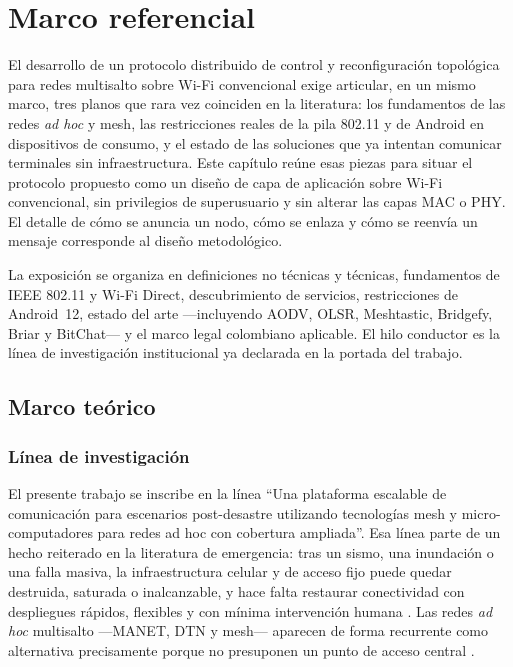 \documentclass[12pt,oneside]{scrreprt}
\begin{document}
\chapter{Marco referencial}
\label{ch:marco}
\label{cap:marco-teorico}

El desarrollo de un protocolo distribuido de control y reconfiguración topológica para redes multisalto sobre Wi-Fi convencional exige articular, en un mismo marco, tres planos que rara vez coinciden en la literatura: los fundamentos de las redes \emph{ad hoc} y mesh, las restricciones reales de la pila 802.11 y de Android en dispositivos de consumo, y el estado de las soluciones que ya intentan comunicar terminales sin infraestructura. Este capítulo reúne esas piezas para situar el protocolo propuesto como un diseño de capa de aplicación sobre Wi-Fi convencional, sin privilegios de superusuario y sin alterar las capas MAC o PHY. El detalle de cómo se anuncia un nodo, cómo se enlaza y cómo se reenvía un mensaje corresponde al diseño metodológico.

La exposición se organiza en definiciones no técnicas y técnicas, fundamentos de IEEE 802.11 y Wi-Fi Direct, descubrimiento de servicios, restricciones de Android~12, estado del arte ---incluyendo AODV, OLSR, Meshtastic, Bridgefy, Briar y BitChat--- y el marco legal colombiano aplicable. El hilo conductor es la línea de investigación institucional ya declarada en la portada del trabajo.

\section{Marco teórico}

\subsection{Línea de investigación}
\label{sec:linea-investigacion}

El presente trabajo se inscribe en la línea \enquote{Una plataforma escalable de comunicación para escenarios post-desastre utilizando tecnologías mesh y micro-computadores para redes ad hoc con cobertura ampliada}. Esa línea parte de un hecho reiterado en la literatura de emergencia: tras un sismo, una inundación o una falla masiva, la infraestructura celular y de acceso fijo puede quedar destruida, saturada o inalcanzable, y hace falta restaurar conectividad con despliegues rápidos, flexibles y con mínima intervención humana \parencite{Miranda2016,Reina2015}. Las redes \emph{ad hoc} multisalto ---MANET, DTN y mesh--- aparecen de forma recurrente como alternativa precisamente porque no presuponen un punto de acceso central \parencite{Akyildiz2005,Conti2014}.
\end{document}

